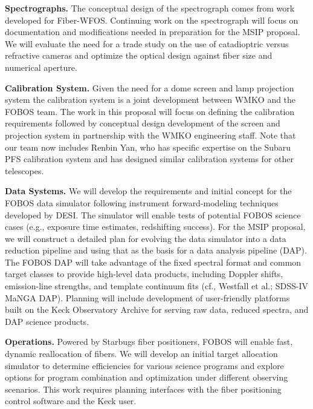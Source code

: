 \noindent \textbf{Spectrographs.} The conceptual design of the
spectrograph comes from work developed for Fiber-WFOS.  Continuing work
on the spectrograph will focus on documentation and modifications needed
in preparation for the MSIP proposal.  We will evaluate the need for a trade study on the use of catadioptric versus refractive cameras and optimize the optical design against fiber size and numerical aperture.

\noindent \textbf{Calibration System.} Given the need for a dome screen
and lamp projection system the calibration system is a joint development
between WMKO and the FOBOS team.  The work in this proposal will focus
on defining the calibration requirements followed by conceptual design
development of the screen and projection system in partnership with the
WMKO engineering staff.  Note that our team now includes Renbin Yan, who has specific expertise on the Subaru PFS calibration system and has designed similar calibration systems for other telescopes.


\noindent \textbf{Data Systems.} We will develop the requirements and initial concept for the FOBOS data simulator following instrument forward-modeling techniques developed by DESI.  The simulator will enable tests of potential FOBOS science cases (e.g., exposure time estimates, redshifting success).  For the MSIP proposal, we will construct a detailed plan for evolving the data simulator into a data reduction pipeline and using that as the basis for a data analysis pipeline (DAP).  The FOBOS DAP will take advantage of the fixed spectral format and common target
classes to provide high-level data products, including Doppler shifts, emission-line strengths, and template continuum
fits (cf., Westfall et al.; SDSS-IV MaNGA DAP).  Planning will include development of user-friendly platforms built on
the Keck Observatory Archive for serving raw data, reduced spectra, and DAP science products.

\noindent \textbf{Operations.} Powered by Starbugs fiber positioners, FOBOS
will enable fast, dynamic reallocation of fibers.  We will develop an initial target allocation simulator to determine efficiencies for various science programs and explore options for program combination and optimization under different observing scenarios.  This work requires planning interfaces with the fiber positioning control software and the Keck user.

